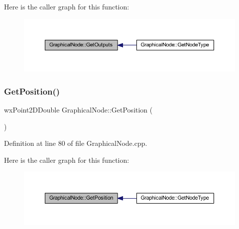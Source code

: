 Here is the caller graph for this function\+:
\nopagebreak
\begin{figure}[H]
\begin{center}
\leavevmode
\includegraphics[width=350pt]{class_graphical_node_a2d4169669b106f7351178e4fbc60be85_icgraph}
\end{center}
\end{figure}
\mbox{\label{class_graphical_node_a87de11aad81e7b4a3baf53d47034e5f5}} 
\subsubsection{\texorpdfstring{Get\+Position()}{GetPosition()}}
{\footnotesize\ttfamily wx\+Point2\+D\+Double Graphical\+Node\+::\+Get\+Position (\begin{DoxyParamCaption}{ }\end{DoxyParamCaption})}



Definition at line 80 of file Graphical\+Node.\+cpp.

Here is the caller graph for this function\+:
\nopagebreak
\begin{figure}[H]
\begin{center}
\leavevmode
\includegraphics[width=350pt]{class_graphical_node_a87de11aad81e7b4a3baf53d47034e5f5_icgraph}
\end{center}
\end{figure}
\mbox{\label{class_graphical_node_a9d89885db9553820d3557a801a83b9de}} 

